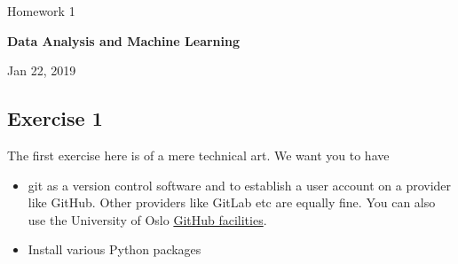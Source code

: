 \documentclass[%
oneside,                 %
final,                   %
10pt]{article}
\begin{document}

\newcommand{\exercisesection}[1]{\subsection*{#1}}






\thispagestyle{empty}

\begin{center}
{\LARGE\bf
\begin{spacing}{1.25}
Homework 1
\end{spacing}
}
\end{center}


\begin{center}
{\bf Data Analysis and Machine Learning${}^{}$} \\ [0mm]
\end{center}

\begin{center}
\end{center}
    

\begin{center}
Jan 22, 2019
\end{center}

\vspace{1cm}


\subsection*{Exercise 1}

The first exercise here is of a mere technical art. We want you to have 
\begin{itemize}
\item git as a version control software and to establish a user account on a provider like GitHub. Other providers like GitLab etc are equally fine. You can also use the University of Oslo \href{{https://www.uio.no/tjenester/it/maskin/filer/versjonskontroll/github.html}}{GitHub facilities}. 

\item Install various Python packages
\end{itemize}
\end{document}
